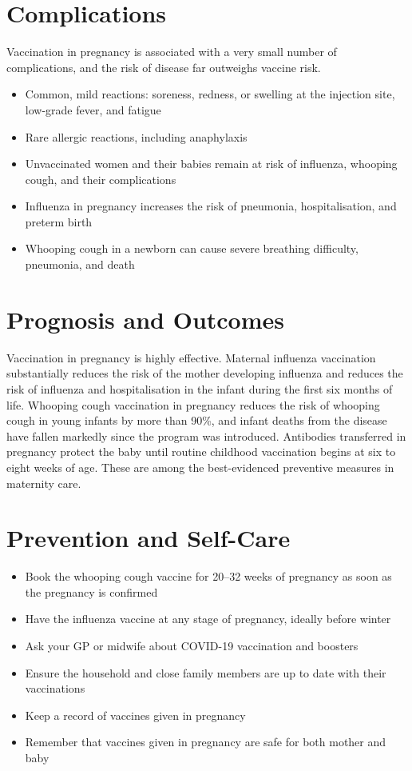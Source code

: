 \section*{Complications}
Vaccination in pregnancy is associated with a very small number of complications, and the risk of disease far outweighs vaccine risk.
\begin{itemize}
    \item Common, mild reactions: soreness, redness, or swelling at the injection site, low-grade fever, and fatigue
    \item Rare allergic reactions, including anaphylaxis
    \item Unvaccinated women and their babies remain at risk of influenza, whooping cough, and their complications
    \item Influenza in pregnancy increases the risk of pneumonia, hospitalisation, and preterm birth
    \item Whooping cough in a newborn can cause severe breathing difficulty, pneumonia, and death
\end{itemize}

\section*{Prognosis and Outcomes}
Vaccination in pregnancy is highly effective. Maternal influenza vaccination substantially reduces the risk of the mother developing influenza and reduces the risk of influenza and hospitalisation in the infant during the first six months of life. Whooping cough vaccination in pregnancy reduces the risk of whooping cough in young infants by more than 90\%, and infant deaths from the disease have fallen markedly since the program was introduced. Antibodies transferred in pregnancy protect the baby until routine childhood vaccination begins at six to eight weeks of age. These are among the best-evidenced preventive measures in maternity care.

\section*{Prevention and Self-Care}
\begin{itemize}
    \item Book the whooping cough vaccine for 20--32 weeks of pregnancy as soon as the pregnancy is confirmed
    \item Have the influenza vaccine at any stage of pregnancy, ideally before winter
    \item Ask your GP or midwife about COVID-19 vaccination and boosters
    \item Ensure the household and close family members are up to date with their vaccinations
    \item Keep a record of vaccines given in pregnancy
    \item Remember that vaccines given in pregnancy are safe for both mother and baby
\end{itemize}

